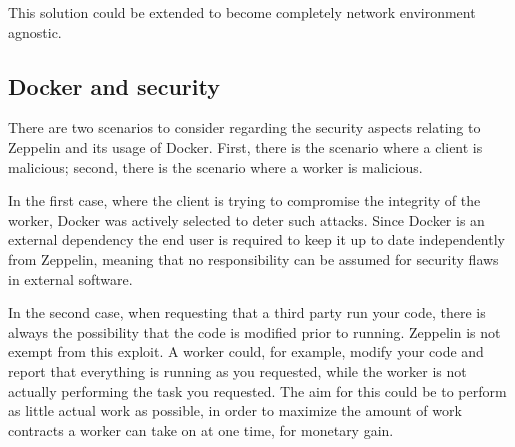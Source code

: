 This solution could be extended to become completely network environment agnostic.

\subsection{Docker and security}
There are two scenarios to consider regarding the security aspects relating to Zeppelin and its usage of Docker. First, there is the scenario where a client is malicious; second, there is the scenario where a worker is malicious.

In the first case, where the client is trying to compromise the integrity of the worker, Docker was actively selected to deter such attacks. Since Docker is an external dependency the end user is required to keep it up to date independently from Zeppelin, meaning that no responsibility can be assumed for security flaws in external software.

In the second case, when requesting that a third party run your code, there is always the possibility that the code is modified prior to running. Zeppelin is not exempt from this exploit. A worker could, for example, modify your code and report that everything is running as you requested, while the worker is not actually performing the task you requested. The aim for this could be to perform as little actual work as possible, in order to maximize the amount of work contracts a worker can take on at one time, for monetary gain. 
